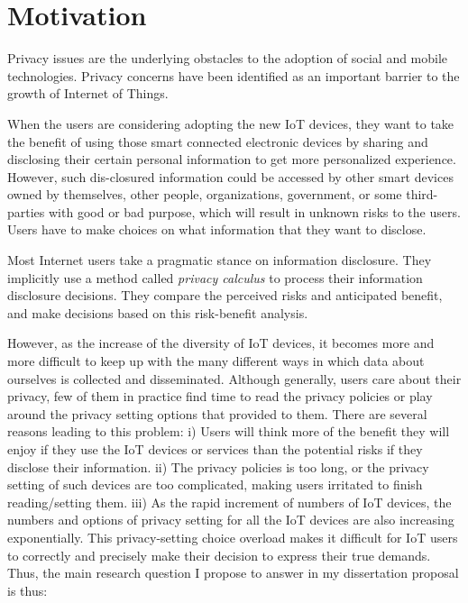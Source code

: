 \chapter{Motivation}\label{motivation}\label{chapter:Motivation}

Privacy issues are the underlying obstacles to the adoption of social and mobile technologies. Privacy concerns have been identified as an important barrier to the growth of Internet of Things. 

When the users are considering adopting the new IoT devices, they want to take the benefit of using those smart connected electronic devices by sharing and disclosing their certain personal information to get more personalized experience. However, such dis-closured information could be accessed by other smart devices owned by themselves, other people, organizations, government, or some third-parties with good or bad purpose, which will result in unknown risks to the users. Users have to make choices on what information that they want to disclose.

Most Internet users take a pragmatic stance on information disclosure. They implicitly use a method called \textit{privacy calculus} to process their information disclosure decisions. They compare the perceived risks and anticipated benefit, and make decisions based on this risk-benefit analysis.

However, as the increase of the diversity of IoT devices, it becomes more and more difficult to keep up with the many different ways in which data about ourselves is collected and disseminated. Although generally, users care about their privacy, few of them in practice find time to read the privacy policies or play around the privacy setting options that provided to them. There are several reasons leading to this problem: i) Users will think more of the benefit they will enjoy if they use the IoT devices or services than the potential risks if they disclose their information. ii) The privacy policies is too long, or the privacy setting of such devices are too complicated, making users irritated to finish reading/setting them. iii) As the rapid increment of numbers of IoT devices, the numbers and options of privacy setting for all the IoT devices are also increasing exponentially. This privacy-setting choice overload makes it difficult for IoT users to correctly and precisely make their decision to express their true demands. Thus, the main research question I propose to answer in my dissertation proposal is thus:


